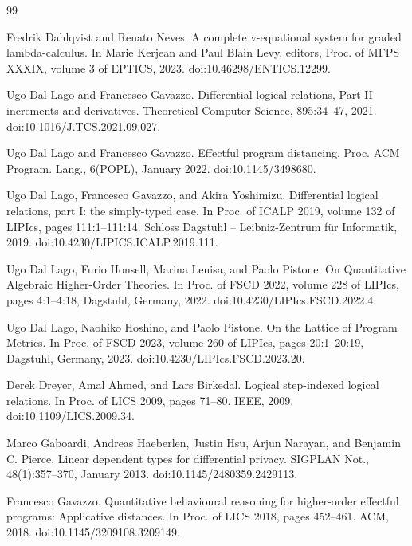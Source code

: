 \documentclass[10pt,a4paper]{amsart}
\begin{document}
\begin{thebibliography}{99}
\par\noindent  [8]  Fredrik Dahlqvist and Renato Neves.  A complete v-equational system for graded lambda-calculus.  In Marie Kerjean and Paul Blain Levy, editors, Proc. of MFPS XXXIX, volume 3 of EPTICS, 2023.  doi:10.46298/ENTICS.12299.  
 
\par\noindent  [9]  Ugo Dal Lago and Francesco Gavazzo.  Differential logical relations, Part II increments and derivatives.  Theoretical Computer Science, 895:34–47, 2021.  doi:10.1016/J.TCS.2021.09.027.  
 
\par\noindent  [10]  Ugo Dal Lago and Francesco Gavazzo.  Effectful program distancing.  Proc. ACM Program. Lang., 6(POPL), January 2022.  doi:10.1145/3498680.  
 
\par\noindent  [11]  Ugo Dal Lago, Francesco Gavazzo, and Akira Yoshimizu.  Differential logical relations, part I: the simply-typed case.  In Proc. of ICALP 2019, volume 132 of LIPIcs, pages 111:1–111:14. Schloss Dagstuhl – Leibniz-Zentrum für Informatik, 2019.  doi:10.4230/LIPICS.ICALP.2019.111.  
 
\par\noindent  [12]  Ugo Dal Lago, Furio Honsell, Marina Lenisa, and Paolo Pistone.  On Quantitative Algebraic Higher-Order Theories.  In Proc. of FSCD 2022, volume 228 of LIPIcs, pages 4:1–4:18, Dagstuhl, Germany, 2022.  doi:10.4230/LIPIcs.FSCD.2022.4.  
 
\par\noindent  [13]  Ugo Dal Lago, Naohiko Hoshino, and Paolo Pistone.  On the Lattice of Program Metrics.  In Proc. of FSCD 2023, volume 260 of LIPIcs, pages 20:1–20:19, Dagstuhl, Germany, 2023.  doi:10.4230/LIPIcs.FSCD.2023.20.  
 
\par\noindent  [14]  Derek Dreyer, Amal Ahmed, and Lars Birkedal.  Logical step-indexed logical relations.  In Proc. of LICS 2009, pages 71–80. IEEE, 2009.  doi:10.1109/LICS.2009.34.  
 
\par\noindent  [15]  Marco Gaboardi, Andreas Haeberlen, Justin Hsu, Arjun Narayan, and Benjamin C. Pierce.  Linear dependent types for differential privacy.  SIGPLAN Not., 48(1):357–370, January 2013.  doi:10.1145/2480359.2429113.  
 
\par\noindent  [16]  Francesco Gavazzo.  Quantitative behavioural reasoning for higher-order effectful programs: Applicative distances.  In Proc. of LICS 2018, pages 452–461. ACM, 2018.  doi:10.1145/3209108.3209149.  
 

\end{thebibliography}
\end{document}
